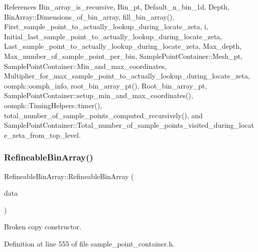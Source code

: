 References Bin\+\_\+array\+\_\+is\+\_\+recursive, Bin\+\_\+pt, Default\+\_\+n\+\_\+bin\+\_\+1d, Depth, Bin\+Array\+::\+Dimensions\+\_\+of\+\_\+bin\+\_\+array, fill\+\_\+bin\+\_\+array(), First\+\_\+sample\+\_\+point\+\_\+to\+\_\+actually\+\_\+lookup\+\_\+during\+\_\+locate\+\_\+zeta, i, Initial\+\_\+last\+\_\+sample\+\_\+point\+\_\+to\+\_\+actually\+\_\+lookup\+\_\+during\+\_\+locate\+\_\+zeta, Last\+\_\+sample\+\_\+point\+\_\+to\+\_\+actually\+\_\+lookup\+\_\+during\+\_\+locate\+\_\+zeta, Max\+\_\+depth, Max\+\_\+number\+\_\+of\+\_\+sample\+\_\+point\+\_\+per\+\_\+bin, Sample\+Point\+Container\+::\+Mesh\+\_\+pt, Sample\+Point\+Container\+::\+Min\+\_\+and\+\_\+max\+\_\+coordinates, Multiplier\+\_\+for\+\_\+max\+\_\+sample\+\_\+point\+\_\+to\+\_\+actually\+\_\+lookup\+\_\+during\+\_\+locate\+\_\+zeta, oomph\+::oomph\+\_\+info, root\+\_\+bin\+\_\+array\+\_\+pt(), Root\+\_\+bin\+\_\+array\+\_\+pt, Sample\+Point\+Container\+::setup\+\_\+min\+\_\+and\+\_\+max\+\_\+coordinates(), oomph\+::\+Timing\+Helpers\+::timer(), total\+\_\+number\+\_\+of\+\_\+sample\+\_\+points\+\_\+computed\+\_\+recursively(), and Sample\+Point\+Container\+::\+Total\+\_\+number\+\_\+of\+\_\+sample\+\_\+points\+\_\+visited\+\_\+during\+\_\+locate\+\_\+zeta\+\_\+from\+\_\+top\+\_\+level.

\mbox{\label{classRefineableBinArray_a0f9458336a724be7281174800d268073}} 
\subsubsection{\texorpdfstring{Refineable\+Bin\+Array()}{RefineableBinArray()}\hspace{0.1cm}{\footnotesize\ttfamily [2/2]}}
{\footnotesize\ttfamily Refineable\+Bin\+Array\+::\+Refineable\+Bin\+Array (\begin{DoxyParamCaption}\item[{const \hyperlink{classRefineableBinArray}{Refineable\+Bin\+Array} \&}]{data }\end{DoxyParamCaption})\hspace{0.3cm}{\ttfamily [inline]}}



Broken copy constructor. 



Definition at line 555 of file sample\+\_\+point\+\_\+container.\+h.



